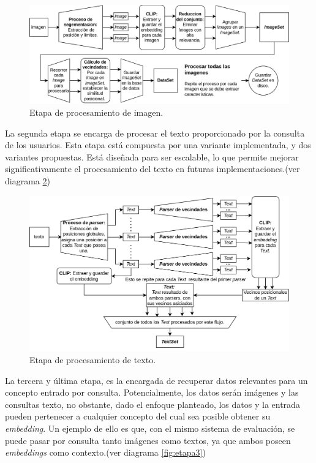 \begin{figure}[H]
\centering
\includegraphics[width=\textwidth]{Graphics/Image.drawio.png}
\caption{Etapa de procesamiento de imagen.}
\label{fig:etapa1}
\end{figure}

La segunda etapa se encarga de procesar el texto proporcionado por la consulta de los usuarios. Esta etapa está compuesta por una variante implementada, y dos variantes propuestas. Está diseñada para ser escalable, lo que permite mejorar significativamente el procesamiento del texto en futuras implementaciones.(ver diagrama \ref{fig:etapa2})


\begin{figure}[H]
    \centering
    \includegraphics[width=\textwidth]{Graphics/Text.drawio.png}
\caption{Etapa de procesamiento de texto.}
\label{fig:etapa2}
    \end{figure}

La tercera y \'ultima etapa, es la encargada de recuperar datos relevantes para un concepto entrado por consulta. Potencialmente, los datos ser\'an im\'agenes y las consultas texto, no obstante, dado el enfoque planteado, los datos y la entrada pueden pertenecer a cualquier concepto del cual sea posible obtener su \textit{embedding}. Un ejemplo de ello es que, con el mismo sistema de evaluaci\'on, se puede pasar por consulta tanto imágenes como textos, ya que ambos poseen \textit{embeddings} como contexto.(ver diagrama \ref{fig:etapa3})

